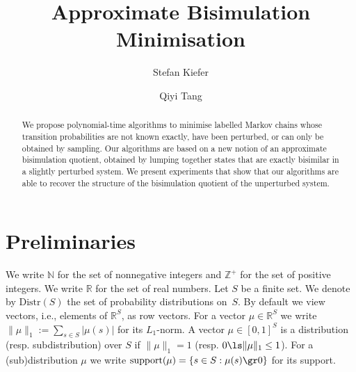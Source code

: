 \documentclass[a4paper,UKenglish,cleveref,autoref,thm-restate]{lipics-v2021}
\title{Approximate Bisimulation Minimisation} %
\author{Stefan Kiefer}{Department of Computer Science, University of Oxford, UK}{stekie@cs.ox.ac.uk}{https://orcid.org/0000-0003-4173-6877}{Supported by a Royal Society University Fellowship.}%
\author{Qiyi Tang}{Department of Computer Science, University of Oxford, UK}{qiyi.tang@cs.ox.ac.uk}{https://orcid.org/0000-0002-9265-3011}{}
\newcommand{\suchthat}{:}%
\newcommand{\Dist}{\mathrm{Distr}}
\newcommand{\support}{\mathrm{support}}
\newcommand{\nat}{\mathbb{N}}
\newcommand{\integer}{\mathbb{Z}}
\newcommand{\tv}{\mathit{tv}}
\newcommand{\modify}[1]{{\color{black}#1}}
\begin{document}
\sloppy
	
\maketitle
	
\begin{abstract}
We propose polynomial-time algorithms to minimise labelled Markov chains whose transition probabilities are not known exactly, have been perturbed, or can only be obtained by sampling.
Our algorithms are based on a new notion of an approximate bisimulation quotient, obtained by lumping together states that are exactly bisimilar in a slightly perturbed system.
We present experiments that show that our algorithms are able to recover the structure of the bisimulation quotient of the unperturbed system.
\end{abstract}
	

\section{Preliminaries}
\label{section:preliminaries}

We write $\nat$ for the set of nonnegative integers and $\integer^{+}$ for the set of positive integers. We write $\mathbb{R}$ for the set of real numbers. Let $S$ be a finite set. We denote by $\Dist(S)$ the set of probability distributions on~$S$. By default we view vectors, i.e., elements of $\mathbb{R}^{S}$, as row vectors. For a vector $\mu \in\mathbb{R}^{S}$ we write \modify{$\|\mu\|_1 := \sum_{s \in S} |\mu(s)|$ for its $L_1$-norm. A vector $\mu \in [0, 1]^{S}$ is a distribution (resp. subdistribution) over $S$ if $\|\mu\|_1 = 1$ (resp.  $0 \ls \|\mu\|_1 \le 1$).} For a (sub)distribution $\mu$ we write $\support(\mu) = \{s \in S \suchthat \mu(s) \gr 0 \}$ for its support. %

\end{document}
